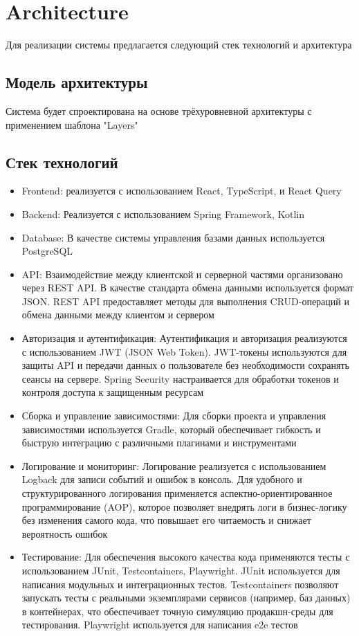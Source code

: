\section{Architecture}
Для реализации системы предлагается следующий стек технологий и архитектура

\subsection{Модель архитектуры}
 Система будет спроектирована на основе трёхуровневной архитектуры с применением шаблона "Layers"
\subsection{Стек технологий}
\begin{itemize}
    \item Frontend: реализуется с использованием React, TypeScript, и React Query
    \item Backend: Реализуется с использованием Spring Framework, Kotlin
    \item Database: В качестве системы управления базами данных используется PostgreSQL    
    \item API: Взаимодействие между клиентской и серверной частями организовано через REST API. В качестве стандарта обмена данными используется формат JSON. REST API предоставляет методы для выполнения CRUD-операций и обмена данными между клиентом и сервером
    \item Авторизация и аутентификация: Аутентификация и авторизация реализуются с использованием JWT (JSON Web Token). JWT-токены используются для защиты API и передачи данных о пользователе без необходимости сохранять сеансы на сервере. Spring Security настраивается для обработки токенов и контроля доступа к защищенным ресурсам
    \item Сборка и управление зависимостями: Для сборки проекта и управления зависимостями используется Gradle, который обеспечивает гибкость и быструю интеграцию с различными плагинами и инструментами
    \item Логирование и мониторинг: Логирование реализуется с использованием Logback для записи событий и ошибок в консоль. Для удобного и структурированного логирования применяется аспектно-ориентированное программирование (AOP), которое позволяет внедрять логи в бизнес-логику без изменения самого кода, что повышает его читаемость и снижает вероятность ошибок
    \item Тестирование: Для обеспечения высокого качества кода применяются тесты с использованием JUnit, Testcontainers, Playwright. JUnit используется для написания модульных и интеграционных тестов. Testcontainers позволяют запускать тесты с реальными экземплярами сервисов (например, баз данных) в контейнерах, что обеспечивает точную симуляцию продакшн-среды для тестирования. Playwright используется для написания e2e тестов
\end{itemize}

